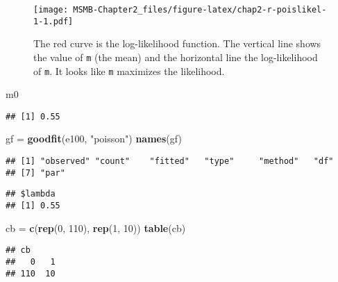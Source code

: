 \documentclass[]{article}
\newenvironment{Shaded}{\begin{snugshade}}{\end{snugshade}}
\newcommand{\KeywordTok}[1]{\textcolor[rgb]{0.13,0.29,0.53}{\textbf{#1}}}
\newcommand{\DecValTok}[1]{\textcolor[rgb]{0.00,0.00,0.81}{#1}}
\newcommand{\StringTok}[1]{\textcolor[rgb]{0.31,0.60,0.02}{#1}}
\newcommand{\OperatorTok}[1]{\textcolor[rgb]{0.81,0.36,0.00}{\textbf{#1}}}
\newcommand{\NormalTok}[1]{#1}
\begin{document}
\begin{figure}
\centering
\texttt{[image: MSMB-Chapter2\_files/figure-latex/chap2-r-poislikel-1-1.pdf]}
\caption{The red curve is the log-likelihood function. The vertical line
shows the value of \texttt{m} (the mean) and the horizontal line the
log-likelihood of \texttt{m}. It looks like \texttt{m} maximizes the
likelihood.}
\end{figure}

\begin{Shaded}
\begin{Highlighting}[]
\NormalTok{m0}
\end{Highlighting}
\end{Shaded}

\begin{verbatim}
## [1] 0.55
\end{verbatim}

\begin{Shaded}
\begin{Highlighting}[]
\NormalTok{gf  =}\StringTok{  }\KeywordTok{goodfit}\NormalTok{(e100, }\StringTok{"poisson"}\NormalTok{)}
\KeywordTok{names}\NormalTok{(gf)}
\end{Highlighting}
\end{Shaded}

\begin{verbatim}
## [1] "observed" "count"    "fitted"   "type"     "method"   "df"      
## [7] "par"
\end{verbatim}

\begin{Shaded}
\end{Shaded}

\begin{verbatim}
## $lambda
## [1] 0.55
\end{verbatim}

\begin{Shaded}
\begin{Highlighting}[]
\NormalTok{cb  =}\StringTok{  }\KeywordTok{c}\NormalTok{(}\KeywordTok{rep}\NormalTok{(}\DecValTok{0}\NormalTok{, }\DecValTok{110}\NormalTok{), }\KeywordTok{rep}\NormalTok{(}\DecValTok{1}\NormalTok{, }\DecValTok{10}\NormalTok{))}
\KeywordTok{table}\NormalTok{(cb)}
\end{Highlighting}
\end{Shaded}

\begin{verbatim}
## cb
##   0   1 
## 110  10
\end{verbatim}
\end{document}
